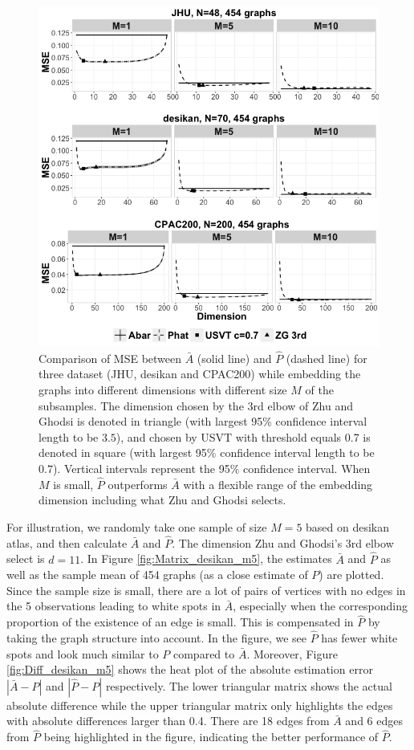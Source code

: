 \documentclass[a4paper]{article}
\begin{document}
\begin{figure}[!htb]
\centering
\includegraphics[width=1\textwidth]{realdata.png}
\caption{Comparison of MSE between $\bar{A}$ (solid line) and $\hat{P}$ (dashed line) for three dataset (JHU, desikan and CPAC200) while embedding the graphs into different dimensions with different size $M$ of the subsamples. The dimension chosen by the 3rd elbow of Zhu and Ghodsi is denoted in triangle (with largest 95\% confidence interval length to be $3.5$), and chosen by USVT with threshold equals 0.7 is denoted in square (with largest 95\% confidence interval length to be $0.7$).  Vertical intervals represent the 95\% confidence interval.  When $M$ is small, $\hat{P}$ outperforms $\bar{A}$ with a flexible range of the embedding dimension including what Zhu and Ghodsi selects.}
\label{fig:realdata}
\end{figure}

For illustration, we randomly take one sample of size $M=5$ based on desikan atlas, and then calculate $\bar{A}$ and $\hat{P}$. The dimension Zhu and Ghodsi's 3rd elbow select is $d=11$. In Figure \ref{fig:Matrix_desikan_m5}, the estimates $\bar{A}$ and $\hat{P}$ as well as the sample mean of 454 graphs (as a close estimate of $P$) are plotted. Since the sample size is small, there are a lot of pairs of vertices with no edges in the 5 observations leading to white spots in $\bar{A}$, especially when the corresponding proportion of the existence of an edge is small. This is compensated in $\hat{P}$ by taking the graph structure into account. In the figure, we see $\hat{P}$ has fewer white spots and look much similar to $P$ compared to $\bar{A}$. Moreover, Figure \ref{fig:Diff_desikan_m5} shows the heat plot of the absolute estimation error $|\bar{A} - P|$ and $|\hat{P}-P|$ respectively. The lower triangular matrix shows the actual absolute difference while the upper triangular matrix only highlights the edges with absolute differences larger than 0.4. There are 18 edges from $\bar{A}$ and 6 edges from $\hat{P}$ being highlighted in the figure, indicating the better performance of $\hat{P}$.
\end{document}
